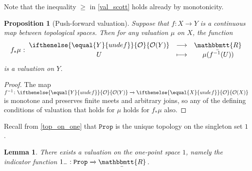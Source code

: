 \documentclass[reqno,11pt]{amsproc}
\theoremstyle{plain}
\newtheorem{proposition}[theorem]{Proposition}
\newtheorem{lemma}[theorem]{Lemma}
\theoremstyle{definition}
\newcommand{\Const}[1]{\mathtt{#1}}
\renewcommand{\to}[1][]{\xrightarrow{#1}}
\newcommand{\ubar}[1]{\underaccent{\bar}{#1}}
\newcommand{\ind}[1]{1_{#1}}			%
\newcommand{\inc}{\ind{-}}			%
\newcommand{\internal}[1]{\raisebox{-.03ex}{$\mathbbmtt{#1}$}}
\newcommand{\hs}{\hspace{1pt}}
\newcommand{\trr}{\internal{R}}
\newcommand{\tlrr}{\ubar{\trr}\hs}
\newcommand{\prop}{\Const{Prop}}
\newcommand{\Op}[1][undef]{\ifthenelse{\equal{#1}{undef}}{\mathcal{O}}{\mathcal{O}(#1)}}
\numberwithin{equation}{section}
\begin{document}
Note that the inequality $\ge$ in \eqref{val_scott} holds already by monotonicity.

\begin{proposition}[Push-forward valuation]
	\label{prop.pushforward}
	Suppose that $f \colon X \to Y$ is a continuous map between topological spaces. Then for any valuation $\mu$ on $X$, the function
	\[
		f_* \mu \: \colon \:
		\begin{matrix}
			\Op[Y]	& \longrightarrow	& \tlrr	\\[2pt]
			U	& \longmapsto		& \mu(f^{-1}(U))
		\end{matrix}
	\]
	is a valuation on $Y$.
\end{proposition}

\begin{proof}
	The map $f^{-1} \colon \Op[Y] \to \Op[X]$ is monotone and preserves finite meets and arbitrary joins, so any of the defining conditions of valuation that holds for $\mu$ holds for $f_*\mu$ also.
\end{proof}

Recall from \cref{top_on_one} that $\prop$ is the unique topology on the singleton set $1$.

\begin{lemma}
	\label{existence_val_on_1}
	There exists a valuation on the one-point space $1$, namely the indicator function $\inc : \prop \to \tlrr$.
\end{lemma}
\end{document}
